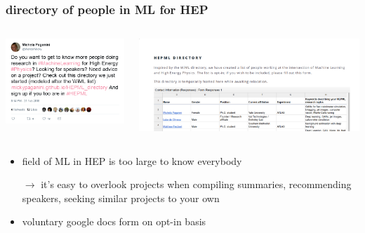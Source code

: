 \begin{frame}
  \frametitle{directory of people in ML for HEP}
  \begin{columns}
    \begin{column}{.3\textwidth}
      \includegraphics[width=.9\textwidth]{./tweet.png}
    \end{column}
    \begin{column}{.7\textwidth}
      \includegraphics[width=\textwidth]{./directory.png}
    \end{column}
  \end{columns}
  \begin{itemize}
    \item field of ML in HEP is too large to know everybody
    \item[$\rightarrow$] it's easy to overlook projects when compiling summaries, recommending speakers, seeking similar projects to your own
    \item voluntary google docs form on opt-in basis
  \end{itemize}
\end{frame}


